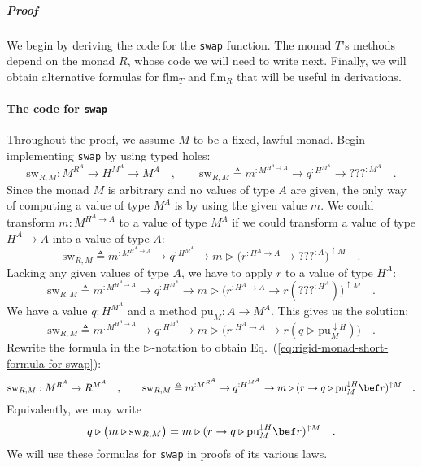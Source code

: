 \subparagraph{Proof}

We begin by deriving the code for the \lstinline!swap! function.
The monad $T$\textsf{'}s methods depend on the monad $R$, whose code we will
need to write next. Finally, we will obtain alternative formulas for
$\text{flm}_{T}$ and $\text{flm}_{R}$ that will be useful in derivations. 

\paragraph{The code for \texttt{swap}}

Throughout the proof, we assume $M$ to be a fixed, lawful monad.
Begin implementing \lstinline!swap! by using typed holes:
\[
\text{sw}_{R,M}:M^{R^{A}}\rightarrow H^{M^{A}}\rightarrow M^{A}\quad,\quad\quad\text{sw}_{R,M}\triangleq m^{:M^{H^{A}\rightarrow A}}\rightarrow q^{:H^{M^{A}}}\rightarrow\text{???}^{:M^{A}}\quad.
\]
Since the monad $M$ is arbitrary and no values of type $A$ are given,
the only way of computing a value of type $M^{A}$ is by using the
given value $m$. We could transform $m:M^{H^{A}\rightarrow A}$ to
a value of type $M^{A}$ if we could transform a value of type $H^{A}\rightarrow A$
into a value of type $A$:
\[
\text{sw}_{R,M}\triangleq m^{:M^{H^{A}\rightarrow A}}\rightarrow q^{:H^{M^{A}}}\rightarrow m\triangleright\big(r^{:H^{A}\rightarrow A}\rightarrow\text{???}^{:A}\big)^{\uparrow M}\quad.
\]
Lacking any given values of type $A$, we have to apply $r$ to a
value of type $H^{A}$:
\[
\text{sw}_{R,M}\triangleq m^{:M^{H^{A}\rightarrow A}}\rightarrow q^{:H^{M^{A}}}\rightarrow m\triangleright\big(r^{:H^{A}\rightarrow A}\rightarrow r(\text{???}^{:H^{A}})\big)^{\uparrow M}\quad.
\]
We have a value $q:H^{M^{A}}$ and a method $\text{pu}_{M}:A\rightarrow M^{A}$.
This gives us the solution:
\[
\text{sw}_{R,M}\triangleq m^{:M^{H^{A}\rightarrow A}}\rightarrow q^{:H^{M^{A}}}\rightarrow m\triangleright\big(r^{:H^{A}\rightarrow A}\rightarrow r(q\triangleright\text{pu}_{M}^{\downarrow H})\big)\quad.
\]
Rewrite the formula in the $\triangleright$-notation to obtain Eq.~(\ref{eq:rigid-monad-short-formula-for-swap}):
\[
\text{sw}_{R,M}:M^{R^{A}}\rightarrow R^{M^{A}}\quad,\quad\quad\text{sw}_{R,M}\triangleq m^{:M^{R^{A}}}\rightarrow q^{:H^{M^{A}}}\rightarrow m\triangleright(r\rightarrow q\triangleright\text{pu}_{M}^{\downarrow H}\bef r)^{\uparrow M}\quad.
\]
Equivalently, we may write
\begin{equation}
q\triangleright\big(m\triangleright\text{sw}_{R,M}\big)=m\triangleright(r\rightarrow q\triangleright\text{pu}_{M}^{\downarrow H}\bef r)^{\uparrow M}\quad.\label{eq:rigid-monad-choice-swap-short}
\end{equation}
We will use these formulas for \lstinline!swap! in proofs of its
various laws.

